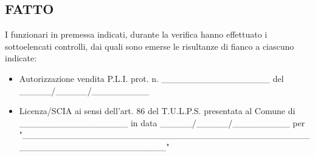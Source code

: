 \documentclass[12pt]{article}
\begin{document}
\centering\subsection*{FATTO}

I funzionari in premessa indicati, durante la verifica hanno effettuato i sottoelencati controlli, dai quali sono emerse le risultanze di fianco a ciascuno indicate:
\begin{itemize}
    \item Autorizzazione vendita P.L.I. prot. n. \_\_\_\_\_\_\_\_\_\_\_\_\_\_\_\_\_ del \_\_\_\_\_/\_\_\_\_\_/\_\_\_\_\_\_\_\_\_
    \item Licenza/SCIA ai sensi dell'art. 86 del T.U.L.P.S. presentata al Comune di \_\_\_\_\_\_\_\_\_\_\_\_\_\_\_\_\_ in data \_\_\_\_\_/\_\_\_\_\_/\_\_\_\_\_\_\_\_\_ per "\_\_\_\_\_\_\_\_\_\_\_\_\_\_\_\_\_\_\_\_\_\_\_\_\_\_\_\_\_\_\_\_\_\_\_\_\_\_\_\_\_\_\_\_\_\_\_\_\_\_\_\_\_\_\_\_\_\_\_\_\_\_\_\_\_\_\_\_"
\end{itemize}
\end{document}
